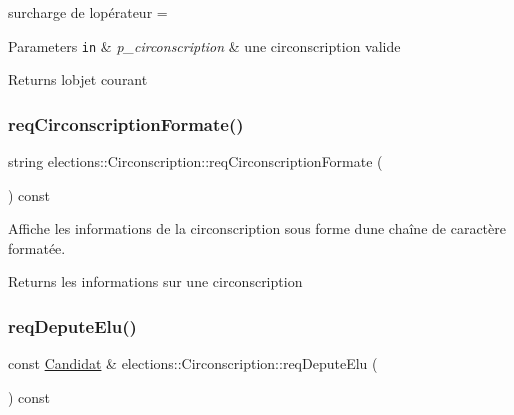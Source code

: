 surcharge de l\textquotesingle{}opérateur = 


\begin{DoxyParams}[1]{Parameters}
\mbox{\tt in}  & {\em p\+\_\+circonscription} & une circonscription valide \\
\hline
\end{DoxyParams}
\begin{DoxyReturn}{Returns}
l\textquotesingle{}objet courant 
\end{DoxyReturn}
\mbox{\label{classelections_1_1Circonscription_aeea7de1ad15f781187aec0f0e01a14f4}} 
\subsubsection{\texorpdfstring{req\+Circonscription\+Formate()}{reqCirconscriptionFormate()}}
{\footnotesize\ttfamily string elections\+::\+Circonscription\+::req\+Circonscription\+Formate (\begin{DoxyParamCaption}{ }\end{DoxyParamCaption}) const}



Affiche les informations de la circonscription sous forme d\textquotesingle{}une chaîne de caractère formatée. 

\begin{DoxyReturn}{Returns}
les informations sur une circonscription 
\end{DoxyReturn}
\mbox{\label{classelections_1_1Circonscription_a162a8ccd10bbfe3297489e19e924f3d1}} 
\subsubsection{\texorpdfstring{req\+Depute\+Elu()}{reqDeputeElu()}}
{\footnotesize\ttfamily const \hyperlink{classelections_1_1Candidat}{Candidat} \& elections\+::\+Circonscription\+::req\+Depute\+Elu (\begin{DoxyParamCaption}{ }\end{DoxyParamCaption}) const}



